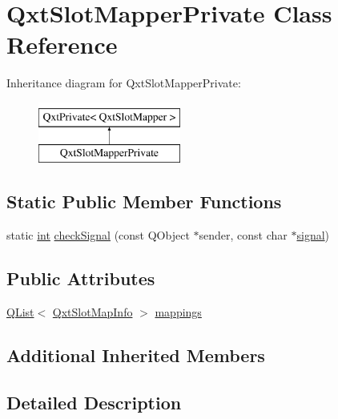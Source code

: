 \hypertarget{class_qxt_slot_mapper_private}{\section{Qxt\-Slot\-Mapper\-Private Class Reference}
\label{class_qxt_slot_mapper_private}
}
Inheritance diagram for Qxt\-Slot\-Mapper\-Private\-:\begin{figure}[H]
\begin{center}
\leavevmode
\includegraphics[height=2.000000cm]{class_qxt_slot_mapper_private}
\end{center}
\end{figure}
\subsection*{Static Public Member Functions}
\begin{DoxyCompactItemize}
\item 
static \hyperlink{ioapi_8h_a787fa3cf048117ba7123753c1e74fcd6}{int} \hyperlink{class_qxt_slot_mapper_private_ab767797e39a387bc1e50a031b7bda235}{check\-Signal} (const Q\-Object $\ast$sender, const char $\ast$\hyperlink{qxtdaemon_8h_aa2d2a7a3fc548ea76dcbc5e441b51260}{signal})
\end{DoxyCompactItemize}
\subsection*{Public Attributes}
\begin{DoxyCompactItemize}
\item 
\hyperlink{class_q_list}{Q\-List}$<$ \hyperlink{struct_qxt_slot_map_info}{Qxt\-Slot\-Map\-Info} $>$ \hyperlink{class_qxt_slot_mapper_private_a750bf83d7c51ab9798007f617b75dddd}{mappings}
\end{DoxyCompactItemize}
\subsection*{Additional Inherited Members}


\subsection{Detailed Description}



